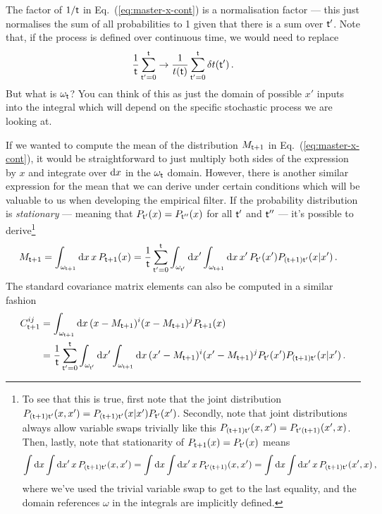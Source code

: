 The factor of $1/{\sf t}$ in Eq.~(\ref{eq:master-x-cont}) is a normalisation factor --- this just normalises the sum of all probabilities to 1 given that there is a sum over ${\sf t}'$. Note that, if the process is defined over continuous time, we would need to replace 
\begin{align}
\frac{1}{{\sf t}}\sum_{{\sf t}'=0}^{{\sf t}} \rightarrow \frac{1}{t({\sf t})}\sum_{{\sf t}'=0}^{{\sf t}}\delta t({\sf t}') \,.
\end{align}
But what is $\omega_{\sf t}$? You can think of this as just the domain of possible $x'$ inputs into the integral which will depend on the specific stochastic process we are looking at.

If we wanted to compute the mean of the distribution $M_{{\sf t}+1}$ in Eq.~(\ref{eq:master-x-cont}), it would be straightforward to just multiply both sides of the expression by $x$ and integrate over ${\rm d}x$ in the $\omega_{{\sf t}}$ domain. However, there is another similar expression for the mean that we can derive under certain conditions which will be valuable to us when developing the empirical filter. If the probability distribution is \emph{stationary} --- meaning that $P_{{\sf t}'}(x)=P_{{\sf t}''}(x)$ for all ${\sf t}'$ and ${\sf t}''$ --- it's possible to derive\footnote{To see that this is true, first note that the joint distribution $P_{({\sf t}+1){\sf t}'}(x,x')=P_{({\sf t}+1){\sf t}'}(x\vert x')P_{{\sf t}'}(x')$. Secondly, note that joint distributions always allow variable swaps trivially like this $P_{({\sf t}+1){\sf t}'}(x,x')=P_{{\sf t}'({\sf t}+1)}(x',x)$. Then, lastly, note that stationarity of $P_{{\sf t}+1}(x)=P_{{\sf t}'}(x)$ means 
$$\int {\rm d}x\int {\rm d}x' \, x\,P_{({\sf t}+1){\sf t}'}(x,x')=\int {\rm d}x\int {\rm d}x'  \, x\, P_{{\sf t}'({\sf t}+1)}(x,x')=\int {\rm d}x\int {\rm d}x'  \, x\, P_{({\sf t}+1){\sf t}'}(x',x)\,,$$
where we've used the trivial variable swap to get to the last equality, and the domain references $\omega$ in the integrals are implicitly defined.} 
\begin{align}
M_{{\sf t}+1} = \int_{\omega_{{\sf t}+1}}{\rm d}x \,x\,P_{{\sf t}+1}(x) &= \frac{1}{{\sf t}}\sum_{{\sf t}'=0}^{{\sf t}}\int_{\omega_{{\sf t}'}}{\rm d}x'\int_{\omega_{{\sf t}+1}}{\rm d}x \, x' \, P_{{\sf t}'}(x') P_{({\sf t}+1){\sf t}'}(x\vert x') \label{eq:stationary-mean-estimator}\,.
\end{align}
The standard covariance matrix elements can also be computed in a similar fashion
\begin{align}
C^{ij}_{{\sf t}+1} &= \int_{\omega_{{\sf t}+1}}{\rm d}x \,(x-M_{{\sf t}+1})^i(x-M_{{\sf t}+1})^jP_{{\sf t}+1}(x) \nonumber \\
&= \frac{1}{{\sf t}}\sum_{{\sf t}'=0}^{{\sf t}}\int_{\omega_{{\sf t}'}}{\rm d}x'\int_{\omega_{{\sf t}+1}}{\rm d}x \, (x'-M_{{\sf t}+1})^i(x'-M_{{\sf t}+1})^j P_{{\sf t}'}(x') P_{({\sf t}+1){\sf t}'}(x\vert x') \label{eq:stationary-covariance-estimator}\,.
\end{align}

